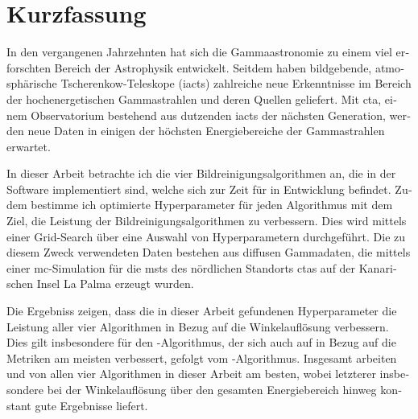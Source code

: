 \section*{Kurzfassung}
\begin{otherlanguage}{ngerman}
In den vergangenen Jahrzehnten hat sich die Gammaastronomie zu einem viel erforschten Bereich der
Astrophysik entwickelt. Seitdem haben bildgebende, atmosphärische Tscherenkow-Teleskope (\glspl{iact})
zahlreiche neue Erkenntnisse im Bereich der hochenergetischen Gammastrahlen und deren Quellen geliefert.
Mit \gls{cta}, einem Observatorium bestehend aus dutzenden \glspl{iact} der nächsten Generation, werden neue Daten in einigen der höchsten
Energiebereiche der Gammastrahlen erwartet.

In dieser Arbeit betrachte ich die vier Bildreinigungsalgorithmen an, die in der Software \ctapipe{} implementiert
sind, welche sich zur Zeit für \cta{} in Entwicklung befindet. Zudem bestimme ich optimierte
Hyperparameter für jeden Algorithmus mit dem Ziel, die Leistung der Bildreinigungsalgorithmen zu verbessern.
Dies wird mittels einer Grid-Search über eine Auswahl von Hyperparametern durchgeführt. Die zu diesem
Zweck verwendeten Daten bestehen aus diffusen Gammadaten, die mittels einer \gls{mc}-Simulation für die
\glspl{mst} des nördlichen Standorts \gls{cta}s auf der Kanarischen Insel La Palma erzeugt wurden.

Die Ergebniss zeigen, dass die in dieser Arbeit gefundenen Hyperparameter die Leistung aller vier
Algorithmen in Bezug auf die Winkelauflösung verbessern. Dies gilt insbesondere für den \tcc{}-Algorithmus,
der sich auch auf in Bezug auf die Metriken am meisten verbessert, gefolgt vom \mars{}-Algorithmus.
Insgesamt arbeiten \fact{} und \mars{} von allen vier Algorithmen in dieser Arbeit am besten, wobei
letzterer insbesondere bei der Winkelauflösung über den gesamten Energiebereich hinweg
konstant gute Ergebnisse liefert.
\end{otherlanguage}
\glsresetall
